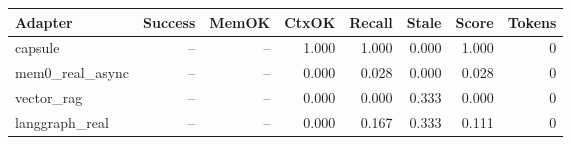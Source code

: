 \begin{tabular}{lrrrrrrr}
\hline
Adapter & Success & MemOK & CtxOK & Recall & Stale & Score & Tokens \\
\hline
capsule & -- & -- & 1.000 & 1.000 & 0.000 & 1.000 & 0 \\
mem0\_real\_async & -- & -- & 0.000 & 0.028 & 0.000 & 0.028 & 0 \\
vector\_rag & -- & -- & 0.000 & 0.000 & 0.333 & 0.000 & 0 \\
langgraph\_real & -- & -- & 0.000 & 0.167 & 0.333 & 0.111 & 0 \\
\hline
\end{tabular}
